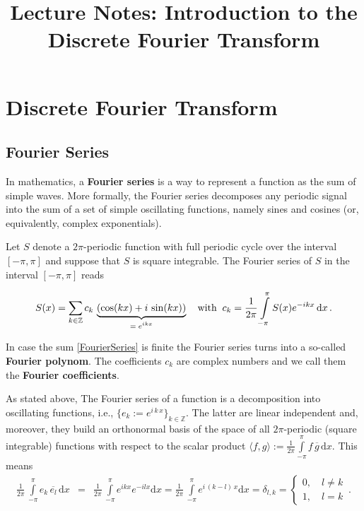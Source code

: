 \documentclass[a4paper, 10pt]{article}
\title{ Lecture Notes: Introduction to the Discrete Fourier Transform}
\begin{document}
\noindent
{

\section{Discrete Fourier Transform}

\subsection{Fourier Series}\label{SSFourierSeries}

In mathematics, a {\bf Fourier series} is a way to represent a function as the sum of simple waves. More formally, the Fourier series decomposes any periodic signal into the sum of a set of simple oscillating functions, namely sines and cosines (or, equivalently, complex exponentials).

Let $S$ denote a $2\pi$-periodic function with full periodic cycle over the interval $[-\pi,\pi]$ and suppose that $S$ is square integrable. The Fourier series of $S$ in the interval $[-\pi,\pi]$ reads

\begin{equation}\label{FourierSeries}
S(x) = \sum\limits_{k\in \mathbb Z} c_k \, \underbrace{\left( \cos(kx) + i\,\sin(kx)\right)}_{\text{$=e^{i k x}$}} \quad \textnormal{with} \;\; c_k = \frac{1}{2\pi} \int\limits_{-\pi}^{\pi} S(x) e^{-i k x}\, \mathrm{d}x\,.
\end{equation}

In case the sum \eqref{FourierSeries} is finite the Fourier series turns into a so-called {\bf Fourier polynom}. The coefficients $c_k$ are complex numbers and we call them the {\bf Fourier coefficients}.


As stated above, The Fourier series of a function is a decomposition into oscillating functions, i.e., $\{ e_k:= e^{i\, k\, x} \}_{k\in \mathbb Z} $. The latter are linear independent and, moreover, they build an orthonormal basis of the space of all $2\pi$-periodic (square integrable) functions with respect to the scalar product $\langle f, g \rangle :=  \frac{1}{2\pi}\int\limits_{-\pi}^{\pi} f\, \overline{g}\, \mathrm d x$. This means
\begin{eqnarray*}
 \frac{1}{2\pi}\,\int\limits_{-\pi}^{\pi} e_k\, \overline{e_l}\, \mathrm d x &=& \frac{1}{2\pi}\,\int\limits_{-\pi}^{\pi} e^{i k x} e^{- i l x} \mathrm d x = \frac{1}{2\pi}\,\int\limits_{-\pi}^{\pi} e^{i\,( k -l)\,x} \mathrm d x = \delta_{l,k} = \begin{cases} 0, \quad l\neq k\\  1, \quad l= k \end{cases} \,.
\end{eqnarray*}

}
\end{document}
